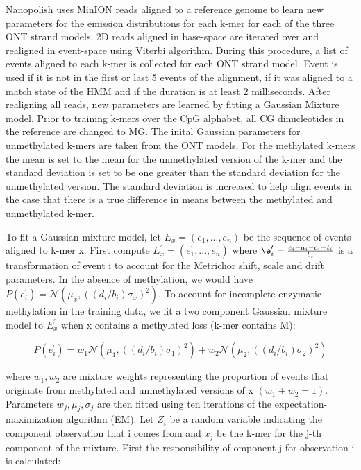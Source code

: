 Nanopolish uses MinION reads aligned to a reference genome to learn new parameters for the emission distributions for each k-mer for each of the three ONT strand models. 2D reads aligned in base-space are iterated over and realigned in event-space using Viterbi algorithm. During this procedure, a list of events aligned to each k-mer is collected for each ONT strand model. Event is used if it is not in the first or last 5 events of the alignment, if it was aligned to a match state of the HMM and if the duration is at least 2 milliseconds. After realigning all reads, new parameters are learned by fitting a Gaussian Mixture model. Prior to training k-mers over the CpG alphabet, all CG dinucleotides in the reference are changed to MG. The inital Gaussian parameters for unmethylated k-mers are taken from the ONT models. For the methylated k-mers the mean is set to the mean for the unmethylated version of the k-mer and the standard deviation is set to be one greater than the standard deviation for the unmethylated version. The standard deviation is increased to help align events in the case that there is a true difference in means between the methylated and unmethylated k-mer. 

To fit a Gaussian mixture model, let $E_x = (e_1,...,e_n)$ be the sequence of events aligned to k-mer x. First compute $E_x^\prime = (e_1^\prime,...,e_n^\prime)$ where $\e_i^\prime=\frac{e_i-a_i-c_i-t_i}{b_i}$ is a transformation of event i to account for the Metrichor shift, scale and drift parameters. In the absence of methylation, we would have $P(e_i^\prime) =\mathcal{N} (\mu_x,((d_i/b_i)\sigma_x)^2)$. To account for incomplete enzymatic methylation in the training data, we fit a two component Gaussian mixture model to $E_x^\prime$ when x contains a methylated loss (k-mer contains M):

\begin{equation}
    \label{eqn:GaussianMixture}
    P(e_i^\prime) = w_1 \mathcal{N}(\mu_1, ((d_i/b_i)\sigma_1)^2) + w_2 \mathcal{N}(\mu_2, ((d_i/b_i)\sigma_2)^2)
\end{equation}

where $w_1, w_2$ are mixture weights representing the proportion of events that originate from methylated and unmethylated versions of x $(w_1+w_2=1)$. Parameters $w_j, \mu_j, \sigma_j$ are then fitted using ten iterations of the expectation-maximization algorithm (EM). Let $Z_i$ be a random variable indicating the component observation that i comes from and $x_j$ be the k-mer for the j-th component of the mixture. First the responsibility of omponent j for observation i is calculated:

